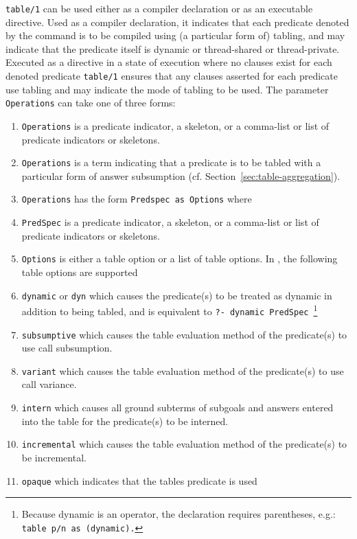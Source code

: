 \begin{description}
\label{table-declaration}
%
{\tt table/1} can be used either as a compiler declaration or as an
executable directive.  Used as a compiler declaration, it indicates
that each predicate denoted by the command is to be compiled using (a
particular form of) tabling, and may indicate that the predicate
itself is dynamic or thread-shared or thread-private.  Executed as a
directive in a state of execution where no clauses exist for each
denoted predicate {\tt table/1} ensures that any clauses asserted for
each predicate use tabling and may indicate the mode of tabling to be
used.  The parameter {\tt Operations} can take one of three forms:
%
\begin{enumerate}
\item {\tt Operations} is a predicate indicator, a skeleton, or
  a comma-list or list of predicate indicators or skeletons.
%
\item {\tt Operations} is a term indicating that a predicate is to be
  tabled with a particular form of answer subsumption
  (cf. Section~\ref{sec:table-aggregation}).
%
\item {\tt Operations} has the form {\tt Predspec as Options} where
\bi
\item {\tt PredSpec} is a predicate indicator, a skeleton, or a
  comma-list or list of predicate indicators or skeletons.
%
\item {\tt Options} is either a table option or a list of table
  options.  In \version, the following table options are supported
\bi
\item {\tt dynamic} or {\tt dyn} which causes the predicate(s) to be
  treated as dynamic in addition to being tabled, and is equivalent to
  {\tt ?- dynamic PredSpec}~\footnote{Because dynamic is an operator,
    the declaration requires parentheses, e.g.: {\tt table p/n as
      (dynamic).}}
%
\item {\tt subsumptive} which causes the table evaluation method of
  the predicate(s) to use call subsumption.
%
\item {\tt variant} which causes the table evaluation method of the
  predicate(s) to use call variance.
%
\item {\tt intern} which causes all ground subterms of subgoals and 
answers entered into the table for the predicate(s) to be interned.
%
\item {\tt incremental} which causes the table evaluation method of
  the predicate(s) to be incremental.
%
\item {\tt opaque} which indicates that the tables predicate is used

\end{enumerate}
\end{description}
